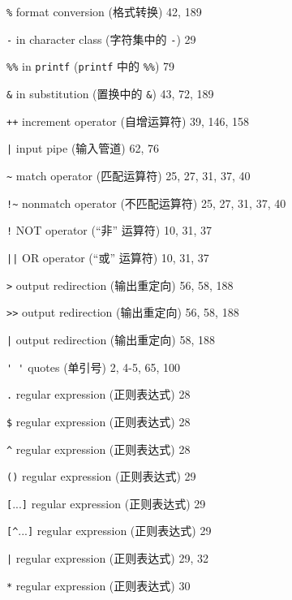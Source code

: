 \begin{multicols}{2}
\hangindent=2pc  \verb'%' format conversion (格式转换) 42, 189

\hangindent=2pc  \verb'-' in character class (字符集中的
\verb'-') 29

\hangindent=2pc  \verb'%%' in \verb'printf' (\verb'printf' 中的
\verb'%%') 79

\hangindent=2pc  \verb'&' in substitution (置换中的
\verb'&') 43, 72, 189

\hangindent=2pc  \verb'++' increment operator (自增运算符) 39, 146, 158

\hangindent=2pc  \verb'|' input pipe (输入管道) 62, 76

\hangindent=2pc  \verb'~' match operator (匹配运算符) 25, 27, 31, 37, 40

\hangindent=2pc  \verb'!~' nonmatch operator (不匹配运算符) 25, 27, 31, 37, 40

\hangindent=2pc  \verb'!' NOT operator (``非'' 运算符) 10, 31, 37

\hangindent=2pc  \verb'||' OR operator (``或'' 运算符) 10, 31, 37

\hangindent=2pc  \verb'>' output redirection (输出重定向) 56, 58, 188

\hangindent=2pc  \verb'>>' output redirection (输出重定向) 56, 58, 188

\hangindent=2pc  \verb'|' output redirection (输出重定向) 58, 188

\hangindent=2pc  \verb"' '" quotes (单引号) 2, 4-5, 65, 100

\hangindent=2pc  \verb'.' regular expression (正则表达式) 28

\hangindent=2pc  \verb'$' regular expression (正则表达式) 28

\hangindent=2pc  \verb'^' regular expression (正则表达式) 28

\hangindent=2pc  \verb'()' regular expression (正则表达式) 29

\hangindent=2pc  \verb'['...\verb']' regular expression
(正则表达式) 29

\hangindent=2pc  \verb'[^'...\verb']' regular expression
(正则表达式) 29

\hangindent=2pc  \verb'|' regular expression (正则表达式) 29, 32

\hangindent=2pc  \verb'*' regular expression (正则表达式) 30


\end{multicols}
